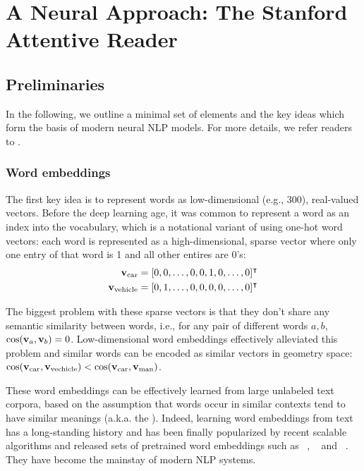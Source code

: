 
\section{A Neural Approach: The Stanford Attentive Reader}
\label{sec:sar}

\subsection{Preliminaries}
In the following, we outline a minimal set of elements and the key ideas which form the basis of modern neural NLP models. For more details, we refer readers to \cite{cho2015natural,goldberg2017neural}.

\subsubsection*{Word embeddings}
The first key idea is to represent words as low-dimensional (e.g., 300), real-valued vectors. Before the deep learning age, it was common to represent a word as an index into the vocabulary, which is a notational variant of using one-hot word vectors: each word is represented as a high-dimensional, sparse vector where only one entry of that word is 1 and all other entires are 0's:
\begin{eqnarray*}
\mathbf{v}_{\text{car}} = [0, 0, \ldots, 0, 0, 1, 0, \ldots, 0]^{\intercal} \\
\mathbf{v}_{\text{vehicle}} = [0, 1, \ldots, 0, 0, 0, 0, \ldots, 0]^{\intercal}
\end{eqnarray*}

The biggest problem with these sparse vectors is that they don't share any semantic similarity between words, i.e., for any pair of different words $a, b$, $\cos(\mathbf{v}_a, \mathbf{v}_b) = 0$. Low-dimensional word embeddings effectively alleviated this problem and similar words can be encoded as similar vectors in geometry space: $\cos(\mathbf{v}_{\text{car}}, \mathbf{v}_{\text{vechicle}}) < \cos(\mathbf{v}_{\text{car}}, \mathbf{v}_{\text{man}})$.

These word embeddings can be effectively learned from large unlabeled text corpora, based on the assumption that words occur in similar contexts tend to have similar meanings (a.k.a. the ). Indeed, learning word embeddings from text has a long-standing history and has been finally popularized by recent scalable algorithms and released sets of pretrained word embeddings such as ~\cite{mikolov2013distributed}, ~\cite{pennington2014glove} and ~\cite{bojanowski2017enriching}. They have become the mainstay of modern NLP systems.

